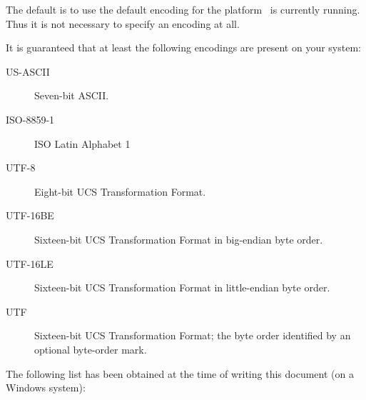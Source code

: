 The default is to use the default encoding for the platform \ExBib\ is
currently running. Thus it is not necessary to specify an encoding at
all.

It is guaranteed that at least the following encodings are present on
your system:

\begin{description}
\item[US-ASCII] 
  Seven-bit ASCII.
\item[ISO-8859-1] 
  ISO Latin Alphabet 1
\item[UTF-8] 
  Eight-bit UCS Transformation Format.
\item[UTF-16BE] 
  Sixteen-bit UCS Transformation Format in big-endian byte order.
\item[UTF-16LE] 
  Sixteen-bit UCS Transformation Format in little-endian byte order.
\item[UTF] Sixteen-bit UCS Transformation Format;
  the byte order identified by an optional byte-order mark.
\end{description}

The following list has been obtained at the time of writing this
document (on a Windows system):

